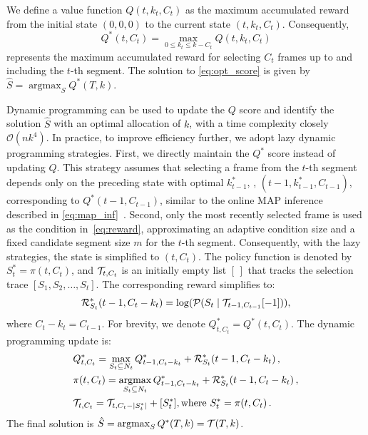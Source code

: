 We define a value function \(Q(t, k_t, C_t)\) as the maximum accumulated reward from the initial state \((0, 0, 0)\) to the current state \((t, k_t, C_t)\). 
Consequently, 
\begin{equation}
    Q^*(t, C_t) = \max\limits_{0 \leq k_t \leq k - C_t} Q(t, k_t, C_t)
\end{equation}
represents the maximum accumulated reward for selecting \(C_t\) frames up to and including the \(t\)-th segment. 
The solution to \cref{eq:opt_score} is given by \(\hat{S} = \mathop{\mathrm{argmax}}_{S} Q^*(T, k)\).




Dynamic programming can be used to update the \(Q\) score and identify the solution \(\hat{S}\) with an optimal allocation of \(k\), with a time complexity closely \(\mathcal{O}(nk^4)\).
%
In practice, to improve efficiency further, we adopt lazy dynamic programming strategies.
First, we directly maintain the \(Q^*\) score instead of updating \(Q\).
This strategy assumes that selecting a frame from the \(t\)-th segment depends only on the preceding state with optimal $k_{t-1}^*$, \ie, \((t-1, k_{t-1}^*, C_{t-1})\), corresponding to \(Q^*(t-1, C_{t-1})\), similar to the online MAP inference described in \cref{eq:map_inf}~\cite{gong2014diverse}.
Second, only the most recently selected frame is used as the condition in~\cref{eq:reward}, approximating an adaptive condition size and a fixed candidate segment size \(m\) for the \(t\)-th segment.
Consequently, with the lazy strategies, the state is simplified to \((t, C_t)\).
The policy function is denoted by \(S_t^*=\pi(t, C_t)\), and \(\mathcal{T}_{t, C_t}\) is an initially empty list \([\,]\) that tracks the selection trace \([S_1, S_2, \dots, S_t]\).
%
The corresponding reward simplifies to:
\begin{equation}
	\mathcal{R}_{S_t}^*(t-1,C_t-k_t)=\log (\mathcal{P}(S_t \mid \mathcal{T}_{t-1, C_{t-1}}[-1])), 	
\end{equation}
where $C_t-k_t = C_{t-1}$.
For brevity, we denote $Q^*_{t, C_t}=Q^*(t, C_t)$.
The dynamic programming update is:
\begin{align}\label{eq:dp_update}
	&Q^*_{t, C_t} = \max_{S_t \subseteq N_t} Q^*_{t-1, C_t-k_t} + \mathcal{R}_{S_t}^*(t-1,C_t-k_t)\,, \notag \\
	&\pi(t, C_t)  = \mathop{\mathrm{argmax}}_{S_t \subseteq N_t} 
					Q^*_{t-1, C_t-k_t} + \mathcal{R}_{S_t}^*(t-1,C_t-k_t)\,, \notag \\
	&\mathcal{T}_{t, C_t} = \mathcal{T}_{t, C_t - |S_t^*|} + [S_t^*],\text{where } S_t^* = \pi(t, C_t)\,.
\end{align}
The final solution is \(\hat{S} = \mathop{\mathrm{argmax}}_{S} Q^*(T, k) = \mathcal{T}(T, k) \).


